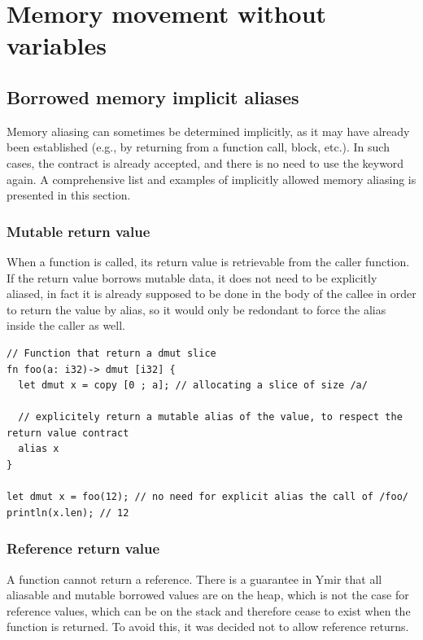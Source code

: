 \section{Memory movement without variables}%
\label{sec:memory:memory_movement}

\subsection{Borrowed memory implicit aliases}

Memory aliasing can sometimes be determined implicitly, as it may have already
been established (e.g., by returning from a function call, block, etc.). In such
cases, the contract is already accepted, and there is no need to use the keyword
 again. A comprehensive list and examples of implicitly allowed
memory aliasing is presented in this section.

\subsubsection*{Mutable return value}

When a function is called, its return value is retrievable from the caller
function. If the return value borrows mutable data, it does not need to be
explicitly aliased, in fact it is already supposed to be done in the body of the
callee in order to return the value by alias, so it would only be redondant to
force the alias inside the caller as well.

\begin{lstlisting}[style=coloredverbatim]
// Function that return a dmut slice
fn foo(a: i32)-> dmut [i32] {
  let dmut x = copy [0 ; a]; // allocating a slice of size /a/

  // explicitely return a mutable alias of the value, to respect the return value contract
  alias x
}

let dmut x = foo(12); // no need for explicit alias the call of /foo/
println(x.len); // 12
\end{lstlisting}

\subsubsection*{Reference return value}

A function cannot return a reference. There is a guarantee in Ymir that all
aliasable and mutable borrowed values are on the heap, which is not the case for
reference values, which can be on the stack and therefore cease to exist when
the function is returned. To avoid this, it was decided not to allow reference
returns.

